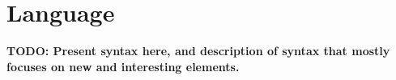 \section{Language}
\label{sec:syntax}


{\bf TODO: Present syntax here, and description of syntax that mostly 
focuses on new and interesting elements.}




